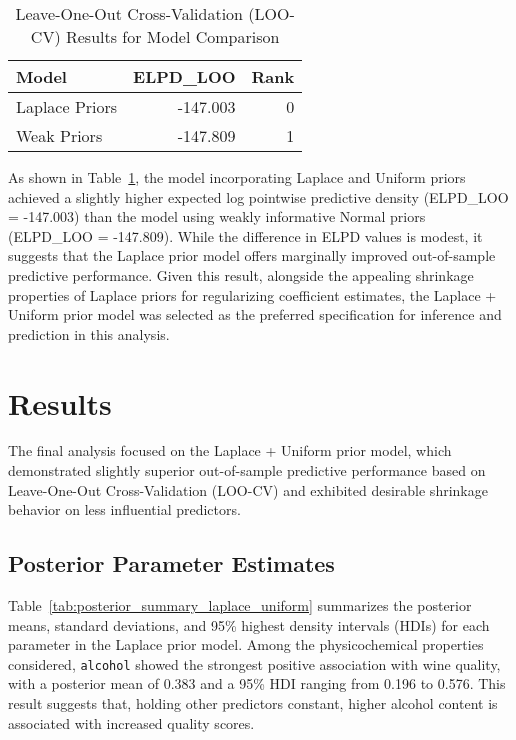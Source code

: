\documentclass[12pt]{article}
\begin{document}
    \begin{table}[h!]
    \centering
    \caption{Leave-One-Out Cross-Validation (LOO-CV) Results for Model Comparison}
    \begin{tabular}{lrr}
    \hline
    \textbf{Model} & \textbf{ELPD\_LOO} & \textbf{Rank} \\
    \hline
    Laplace Priors & -147.003 & 0 \\
    Weak Priors    & -147.809 & 1 \\
    \hline
    \end{tabular}
    \label{tab:loo_results}
    \end{table}
    
    As shown in Table~\ref{tab:loo_results}, the model incorporating Laplace and Uniform priors achieved a slightly higher expected log pointwise predictive density (ELPD\_LOO = -147.003) than the model using weakly informative Normal priors (ELPD\_LOO = -147.809). While the difference in ELPD values is modest, it suggests that the Laplace prior model offers marginally improved out-of-sample predictive performance. Given this result, alongside the appealing shrinkage properties of Laplace priors for regularizing coefficient estimates, the Laplace + Uniform prior model was selected as the preferred specification for inference and prediction in this analysis.

\section{Results}

The final analysis focused on the Laplace + Uniform prior model, which demonstrated slightly superior out-of-sample predictive performance based on Leave-One-Out Cross-Validation (LOO-CV) and exhibited desirable shrinkage behavior on less influential predictors. 

    \subsection{Posterior Parameter Estimates}
    Table~\ref{tab:posterior_summary_laplace_uniform} summarizes the posterior means, standard deviations, and 95\% highest density intervals (HDIs) for each parameter in the Laplace prior model. Among the physicochemical properties considered, \texttt{alcohol} showed the strongest positive association with wine quality, with a posterior mean of 0.383 and a 95\% HDI ranging from 0.196 to 0.576. This result suggests that, holding other predictors constant, higher alcohol content is associated with increased quality scores.
    
\end{document}
